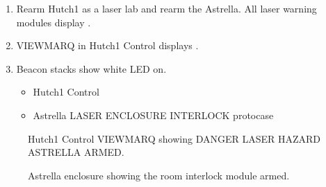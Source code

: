 \documentclass[letterpaper,10pt,english]{sphinxmanual}
\begin{document}
\begin{enumerate}
%
\item {} 
\sphinxAtStartPar
Rearm Hutch\sphinxhyphen{}1 as a laser lab and rearm the Astrella.
All laser warning modules display .

\item {} 
\sphinxAtStartPar
VIEWMARQ in Hutch\sphinxhyphen{}1 Control displays .

\item {} 
\sphinxAtStartPar
Beacon stacks show white LED on.
\begin{itemize}
\item {} 
\sphinxAtStartPar
Hutch\sphinxhyphen{}1 Control

\item {} 
\sphinxAtStartPar
Astrella LASER ENCLOSURE INTERLOCK protocase

\end{itemize}

\end{enumerate}

\begin{figure}[htbp]
\centering
\capstart

\noindent{}
\caption{ Hutch\sphinxhyphen{}1 Control VIEWMARQ showing DANGER LASER HAZARD \sphinxhyphen{} ASTRELLA ARMED.}\label{\detokenize{testing_documentation/Hutch-1_laser:id10}}\end{figure}

\begin{figure}[htbp]
\centering
\capstart

\noindent{}
\caption{ Astrella enclosure showing the room interlock module armed.}\label{\detokenize{testing_documentation/Hutch-1_laser:id11}}\end{figure}
\end{document}
